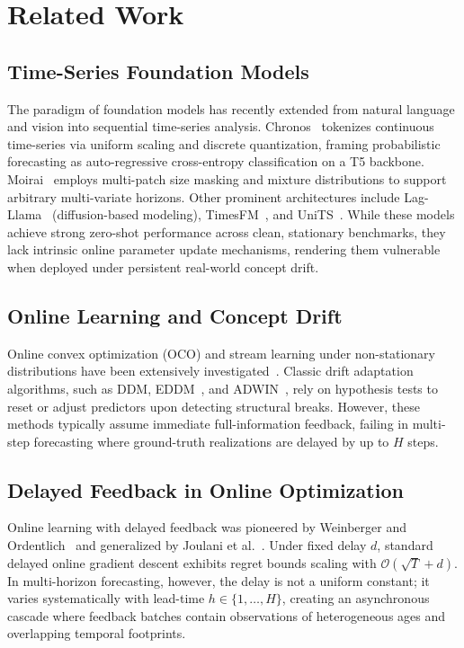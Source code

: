 \documentclass[10pt,journal,compsoc]{IEEEtran}
\begin{document}
\section{Related Work}
\subsection{Time-Series Foundation Models}
The paradigm of foundation models has recently extended from natural language and vision into sequential time-series analysis. Chronos~\cite{ansari2024chronos} tokenizes continuous time-series via uniform scaling and discrete quantization, framing probabilistic forecasting as auto-regressive cross-entropy classification on a T5 backbone. Moirai~\cite{garza2023timegpt} employs multi-patch size masking and mixture distributions to support arbitrary multi-variate horizons. Other prominent architectures include Lag-Llama~\cite{rasul2023lagllama} (diffusion-based modeling), TimesFM~\cite{das2023timesfm}, and UniTS~\cite{gao2024units}. While these models achieve strong zero-shot performance across clean, stationary benchmarks, they lack intrinsic online parameter update mechanisms, rendering them vulnerable when deployed under persistent real-world concept drift.

\subsection{Online Learning and Concept Drift}
Online convex optimization (OCO) and stream learning under non-stationary distributions have been extensively investigated~\cite{hazan2016introduction, zinkevich2003online, besbes2015non}. Classic drift adaptation algorithms, such as DDM, EDDM~\cite{gama2014survey}, and ADWIN~\cite{bifet2007learning}, rely on hypothesis tests to reset or adjust predictors upon detecting structural breaks. However, these methods typically assume immediate full-information feedback, failing in multi-step forecasting where ground-truth realizations are delayed by up to $H$ steps.

\subsection{Delayed Feedback in Online Optimization}
Online learning with delayed feedback was pioneered by Weinberger and Ordentlich~\cite{weinberger2002delayed} and generalized by Joulani et al.~\cite{joulani2013online, joulani2016delay}. Under fixed delay $d$, standard delayed online gradient descent exhibits regret bounds scaling with $\mathcal{O}(\sqrt{T} + d)$. In multi-horizon forecasting, however, the delay is not a uniform constant; it varies systematically with lead-time $h \in \{1, \dots, H\}$, creating an asynchronous cascade where feedback batches contain observations of heterogeneous ages and overlapping temporal footprints.
\end{document}
